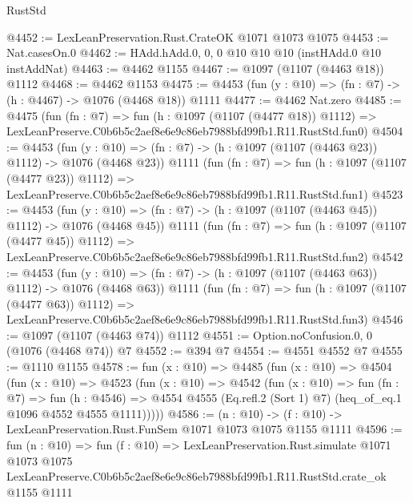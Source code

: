\begin{lexlean}{RustStd}
\begin{coremodule}
@4452 := LexLeanPreservation.Rust.CrateOK @1071 @1073 @1075
@4453 := Nat.casesOn.{0}
@4462 := HAdd.hAdd.{0, 0, 0} @10 @10 @10 (instHAdd.{0} @10 instAddNat)
@4463 := @4462 @1155
@4467 := @1097 (@1107 (@4463 @18)) @1112
@4468 := @4462 @1153
@4475 := @4453 (fun (y : @10) => (fn : @7) -> (h : @4467) -> @1076 (@4468 @18)) @1111
@4477 := @4462 Nat.zero
@4485 := @4475
    (fun (fn : @7) =>
    fun (h : @1097 (@1107 (@4477 @18)) @1112) =>
    LexLeanPreserve.C0b6b5c2aef8e6e9c86eb7988bfd99fb1.R11.RustStd.fun0)
@4504 := @4453
    (fun (y : @10) => (fn : @7) -> (h : @1097 (@1107 (@4463 @23)) @1112) -> @1076 (@4468 @23))
    @1111
    (fun (fn : @7) =>
    fun (h : @1097 (@1107 (@4477 @23)) @1112) =>
    LexLeanPreserve.C0b6b5c2aef8e6e9c86eb7988bfd99fb1.R11.RustStd.fun1)
@4523 := @4453
    (fun (y : @10) => (fn : @7) -> (h : @1097 (@1107 (@4463 @45)) @1112) -> @1076 (@4468 @45))
    @1111
    (fun (fn : @7) =>
    fun (h : @1097 (@1107 (@4477 @45)) @1112) =>
    LexLeanPreserve.C0b6b5c2aef8e6e9c86eb7988bfd99fb1.R11.RustStd.fun2)
@4542 := @4453
    (fun (y : @10) => (fn : @7) -> (h : @1097 (@1107 (@4463 @63)) @1112) -> @1076 (@4468 @63))
    @1111
    (fun (fn : @7) =>
    fun (h : @1097 (@1107 (@4477 @63)) @1112) =>
    LexLeanPreserve.C0b6b5c2aef8e6e9c86eb7988bfd99fb1.R11.RustStd.fun3)
@4546 := @1097 (@1107 (@4463 @74)) @1112
@4551 := Option.noConfusion.{0, 0} (@1076 (@4468 @74)) @7
@4552 := @394 @7
@4554 := @4551 @4552 @7
@4555 := @1110 @1155
@4578 := fun (x : @10) =>
  @4485
    (fun (x : @10) =>
    @4504
      (fun (x : @10) =>
      @4523
        (fun (x : @10) =>
        @4542
          (fun (x : @10) =>
          fun (fn : @7) =>
          fun (h : @4546) =>
          @4554 @4555 (Eq.refl.{2} (Sort 1) @7) (heq_of_eq.{1} @1096 @4552 @4555 @1111)))))
@4586 := (n : @10) -> (f : @10) -> LexLeanPreservation.Rust.FunSem @1071 @1073 @1075 @1155 @1111
@4596 := fun (n : @10) =>
  fun (f : @10) =>
  LexLeanPreservation.Rust.simulate
    @1071
    @1073
    @1075
    LexLeanPreserve.C0b6b5c2aef8e6e9c86eb7988bfd99fb1.R11.RustStd.crate_ok
    @1155
    @1111
\end{coremodule}
\end{lexlean}
